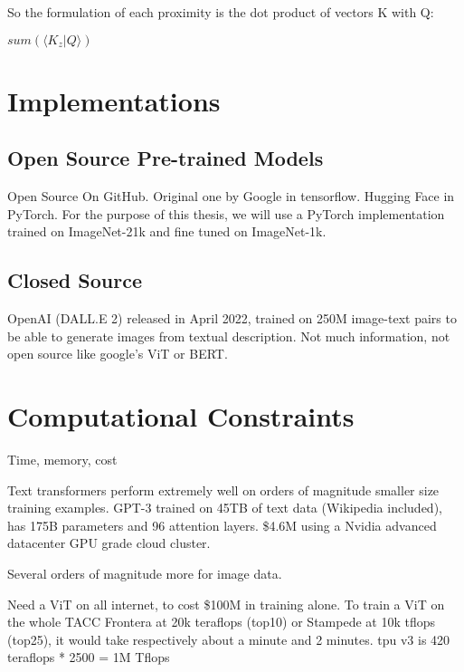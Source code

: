 So the formulation of each proximity is the dot product of vectors K with Q:
\begin{center}
	$ \displaystyle sum(\langle K_z \vert Q \rangle) $
	\end{center}




\newpage

\section{Implementations}
\subsection{Open Source Pre-trained Models}

Open Source
On GitHub.
Original one by Google in tensorflow.
Hugging Face in PyTorch.
For the purpose of this thesis, we will use a PyTorch implementation trained on ImageNet-21k
and fine tuned on ImageNet-1k.

\subsection{Closed Source}

OpenAI (DALL.E 2) released in April 2022, trained on 250M image-text pairs 
to be able to generate images from textual description. \citep{Dalle2}
Not much information, not open source like google's ViT or BERT.

\section{Computational Constraints}

Time, memory, cost

Text transformers perform extremely well on orders of magnitude smaller size training examples.
GPT-3 trained on 45TB of text data (Wikipedia included), has 175B parameters and 96 attention layers. \citep{GPT3}
\$4.6M using a Nvidia advanced datacenter GPU grade cloud cluster.

Several orders of magnitude more for image data.

Need a ViT on all internet, to cost \$100M in training alone. 
To train a ViT on the whole TACC Frontera at 20k teraflops (top10) or 
Stampede at 10k tflops (top25), it would take respectively about a minute and 2 minutes.
tpu v3 is 420 teraflops * 2500 = 1M Tflops








